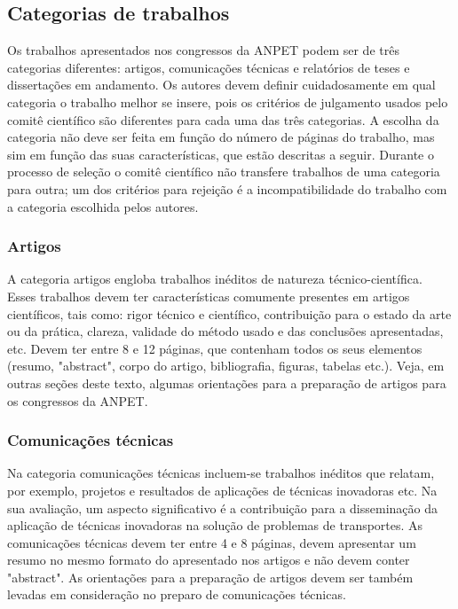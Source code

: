 \documentclass{anpet}
\begin{document}
\subsection{Categorias de trabalhos}
Os trabalhos apresentados nos congressos da ANPET podem ser de três categorias diferentes: artigos, comunicações técnicas e relatórios de teses e dissertações em andamento. Os autores devem definir cuidadosamente em qual categoria o trabalho melhor se insere, pois os critérios de julgamento usados pelo comitê científico são diferentes para cada uma das três categorias. A escolha da categoria não deve ser feita em função do número de páginas do trabalho, mas sim em função das suas características, que estão descritas a seguir. Durante o processo de seleção o comitê científico não transfere trabalhos de uma categoria para outra; um dos critérios para rejeição é a incompatibilidade do trabalho com a categoria escolhida pelos autores.

\subsubsection{Artigos}
A categoria artigos engloba trabalhos inéditos de natureza técnico-científica. Esses trabalhos devem ter características comumente presentes em artigos científicos, tais como: rigor técnico e científico, contribuição para o estado da arte ou da prática, clareza, validade do método usado e das conclusões apresentadas, etc. Devem ter entre 8 e 12 páginas, que contenham todos os seus elementos (resumo, "abstract", corpo do artigo, bibliografia, figuras, tabelas etc.). Veja, em outras seções deste texto, algumas orientações para a preparação de artigos para os congressos da ANPET.

\subsubsection{Comunicações técnicas}
Na categoria comunicações técnicas incluem-se trabalhos inéditos que relatam, por exemplo, projetos e resultados de aplicações de técnicas inovadoras etc. Na sua avaliação, um aspecto significativo é a contribuição para a disseminação da aplicação de técnicas inovadoras na solução de problemas de transportes. As comunicações técnicas devem ter entre 4 e 8 páginas, devem apresentar um resumo no mesmo formato do apresentado nos artigos e não devem conter "abstract". As orientações para a preparação de artigos devem ser também levadas em consideração no preparo de comunicações técnicas.
\end{document}
